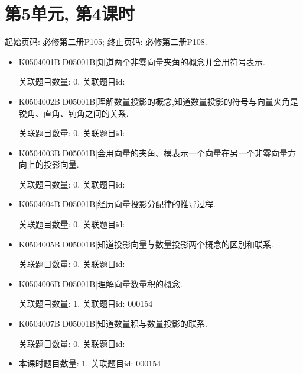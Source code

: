 \section*{第5单元, 第4课时}
起始页码: 必修第二册P105; 终止页码: 必修第二册P108.
\begin{itemize}
\item K0504001B|D05001B|知道两个非零向量夹角的概念并会用符号表示.

关联题目数量: 0. 关联题目id: 

\item K0504002B|D05001B|理解数量投影的概念,知道数量投影的符号与向量夹角是锐角、直角、钝角之间的关系.

关联题目数量: 0. 关联题目id: 

\item K0504003B|D05001B|会用向量的夹角、模表示一个向量在另一个非零向量方向上的投影向量.

关联题目数量: 0. 关联题目id: 

\item K0504004B|D05001B|经历向量投影分配律的推导过程.

关联题目数量: 0. 关联题目id: 

\item K0504005B|D05001B|知道投影向量与数量投影两个概念的区别和联系.

关联题目数量: 0. 关联题目id: 

\item K0504006B|D05001B|理解向量数量积的概念.

关联题目数量: 1. 关联题目id: 000154

\item K0504007B|D05001B|知道数量积与数量投影的联系.

关联题目数量: 0. 关联题目id: 

\item 本课时题目数量: 1. 关联题目id: 000154

\end{itemize}

